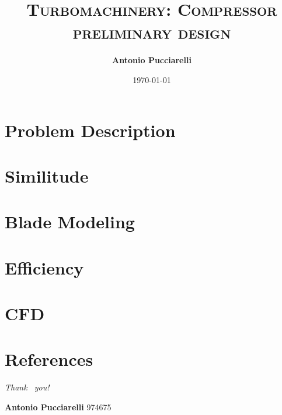 \documentclass{beamer}
\author{\textbf{Antonio Pucciarelli}}
\title{\textsc{Turbomachinery: Compressor preliminary design}}
\institute{Politecnico di Milano}
\date{\today}
\begin{document}
	\begin{frame}
    		\titlepage
    	\end{frame}

	\section{Problem Description}
        
        
	\section{Similitude}
        
    
   	\section{Blade Modeling}
        

	\section{Efficiency}
	

	\section{CFD}
	    
	\section{References}
		
		\begin{frame}[allowframebreaks]
			
				
		\end{frame}
	
	\begin{frame}
		\begin{center}
			{\Huge \emph {\textrm{Thank  ~you!}}}
		\end{center}
		
		\vspace{1cm}
		
		\Large{\textbf{Antonio Pucciarelli}        \hfill 974675} \\ 
        
	\end{frame}
\end{document}
